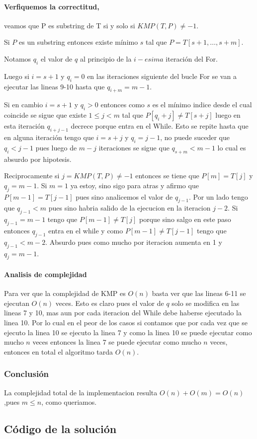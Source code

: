 	\paragraph{Verfiquemos la correctitud,} veamos que P es substring de T si y solo 
		si $KMP(T,P)\neq -1$.
		
		
		Si $P$ es un substring entonces existe m\'inimo $s$ tal que $P=T[s+1,\dots ,s+m]$.
		
		Notamos $q_i$ el valor de $q$ al principio de la $i-esima$ iteraci\'on del For.
		
		Luego si $i=s+1$ y $q_i=0$ en las iteraciones siguiente del bucle For se
		van a ejecutar las lineas 9-10 hasta que $q_{i+m}=m-1$.
		 
		Si en cambio $i=s+1$ y $q_i>0$ entonces como $s$ es el m\'inimo
		indice desde el cual coincide se sigue que existe $1\leq j<m$	
		tal que $P[q_i+j]\neq T[s+j]$ luego en esta iteraci\'on $q_{i+j-1}$ decrece
		porque entra en el While. Esto se repite 
		hasta que en alguna iteraci\'on tengo que $i=s+j$ y $q_i=j-1$, 
		no puede suceder que $q_i<j-1$ pues luego de $m-j$ iteraciones
		se sigue que $q_{s+m}<m-1$ lo cual es absurdo por hipotesis.
	
		
		Reciprocamente si $j=KMP(T,P)\neq -1$ entonces se tiene que
		$P[m]=T[j]$ y $q_j=m-1$. Si $m=1$ ya estoy, sino sigo para atras y afirmo 
		que $P[m-1]=T[j-1]$ pues sino analicemos el valor de $q_{j-1}$. Por
		un lado tengo que $q_{j-1}<m$ pues sino habria salido de la ejecucion
		en la iteracion $j-2$. Si $q_{j-1}=m-1$ tengo que $P[m-1]\neq T[j]$ porque
		sino salgo en este paso entonces $q_{j-1}$ entra en el while y como
		$P[m-1]\neq T[j-1]$ tengo que $q_{j-1}<m-2$. Absurdo pues como mucho
		por iteracion aumenta en 1 y $q_j=m-1$.
	
	\paragraph{Analisis de complejidad}
		Para ver que la complejidad de KMP es $O(n)$  basta ver que
		las lineas 6-11 se ejecutan $O(n)$ veces. 
		Esto es claro pues el valor de $q$ solo se modifica en las lineas
		7 y 10, mas aun por cada iteracion del While debe haberse
		ejecutado la linea 10. Por lo cual en el peor de los casos
		si contamos que por cada vez que se ejecuto la linea 10 se ejecuto
		la linea 7 y como la linea 10 se puede ejecutar como mucho $n$ veces
		entonces la linea 7 se puede ejecutar como mucho $n$ veces, entonces
		en total el algoritmo tarda $O(n)$.
	
	\subsubsection{Conclusi\'on}
		La complejidad total de la implementacion resulta $O(n)+O(m)=O(n)$
		,pues $m\leq n$, como queriamos.
\newpage
\subsection{Código de la solución}
\lstset{inputencoding=utf8/latin1}


